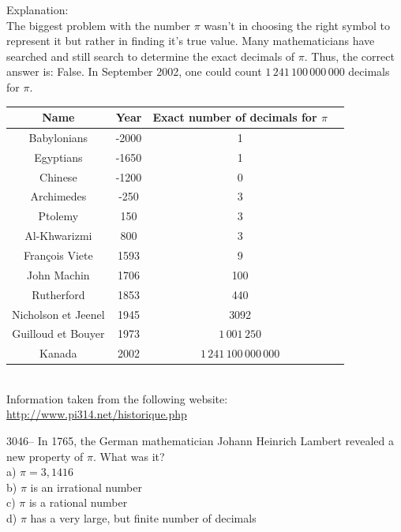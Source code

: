 \documentclass[letterpaper, 12pt]{article}
\begin{document}
Explanation:\\
The biggest problem with the number $\pi$ wasn't in choosing the right symbol to represent it but rather in finding it's true value. Many mathematicians have searched and still search to determine the exact decimals of $\pi$. Thus, the correct answer is: False. In September 2002, one could count $1 \, 241 \, 100 \, 000 \, 000$ decimals for $\pi$.\\
\begin{center}
\begin{tabular}{|c|c|c|c|} \hline
{\bf Name} & {\bf Year} & {\bf Exact number of decimals for $\pi$} \\ \hline \hline
Babylonians & -2000 & 1 \\ \hline
Egyptians & -1650 & 1 \\ \hline
Chinese & -1200 & 0 \\ \hline
Archimedes & -250 & 3 \\ \hline
Ptolemy & 150 & 3 \\ \hline
Al-Khwarizmi & 800 & 3 \\ \hline
Fran\c cois Viete & 1593 & 9 \\ \hline
John Machin & 1706 & 100 \\ \hline
Rutherford & 1853 & 440 \\ \hline
Nicholson et Jeenel & 1945 & 3092 \\ \hline
Guilloud et Bouyer & 1973 & $1 \, 001 \, 250$ \\ \hline
Kanada & 2002 & $1 \, 241 \, 100 \, 000 \, 000$\\ \hline
\end{tabular}\\[2mm]
Information taken from the following website: \href{http://www.pi314.net/historique.php}{http://www.pi314.net/historique.php}\\[5mm]
\end{center}



3046-- In 1765, the German mathematician Johann Heinrich Lambert revealed a new property of $\pi$. What was it?\\

a) $\pi = 3,1416$\\
b) $\pi$ is an irrational number\\
c) $\pi$ is a rational number\\
d) $\pi$ has a very large, but finite number of decimals\\
\end{document}
